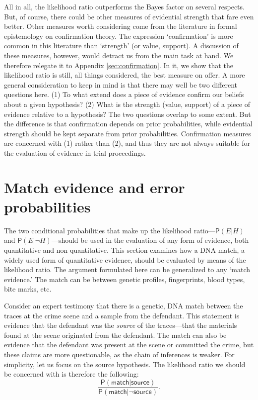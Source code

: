 \documentclass[
  10pt,
  dvipsnames,enabledeprecatedfontcommands]{scrartcl}
\newcommand{\pr}[1]{\mathsf{P}(#1)}
\begin{document}
\vspace{1mm}
\footnotesize

\normalsize

All in all, the likelihood ratio outperforms the Bayes factor on several
respects. But, of course, there could be other measures of evidential
strength that fare even better. Other measures worth considering come
from the literature in formal epistemology on confirmation theory. The
expression `confirmation' is more common in this literature than
`strength' (or value, support). A discussion of these measures, however,
would detract us from the main task at hand. We therefore relegate it to
Appendix \ref{sec:confirmation}. In it, we show that the likelihood
ratio is still, all things considered, the best measure on offer. A more
general consideration to keep in mind is that there may well be two
different questions here. (1) To what extend does a piece of evidence
confirm our beliefs about a given hypothesis? (2) What is the strength
(value, support) of a piece of evidence relative to a hypothesis? The
two questions overlap to some extent. But the difference is that
confirmation depends on prior probabilities, while evidential strength
should be kept separate from prior probabilities. Confirmation measures
are concerned with (1) rather than (2), and thus they are not always
suitable for the evaluation of evidence in trial proceedings.

\hypertarget{match-evidence-and-error-probabilities}{%
\section{\texorpdfstring{Match evidence and error probabilities
\label{sec:fp}}{Match evidence and error probabilities }}\label{match-evidence-and-error-probabilities}}

The two conditional probabilities that make up the likelihood
ratio---\(\pr{E \vert H}\) and \(\pr{E \vert \neg H}\)---should be used
in the evaluation of any form of evidence, both quantitative and
non-quantitative. This section examines how a DNA match, a widely used
form of quantitative evidence, should be evaluated by means of the
likelihood ratio. The argument formulated here can be generalized to any
`match evidence.' The match can be between genetic profiles,
fingerprints, blood types, bite marks, etc.

Consider an expert testimony that there is a genetic, DNA match between
the traces at the crime scene and a sample from the defendant. This
statement is evidence that the defendant was the \textit{source} of the
traces---that the materials found at the scene originated from the
defendant. The match can also be evidence that the defendant was present
at the scene or committed the crime, but these claims are more
questionable, as the chain of inferences is weaker. For simplicity, let
us focus on the source hypothesis. The likelihood ratio we should be
concerned with is therefore the following:
\[\frac{\pr{\textsf{match} \vert \textsf{source}}}{\pr{\textsf{match} \vert \neg \textsf{source}}}.\]
\end{document}
